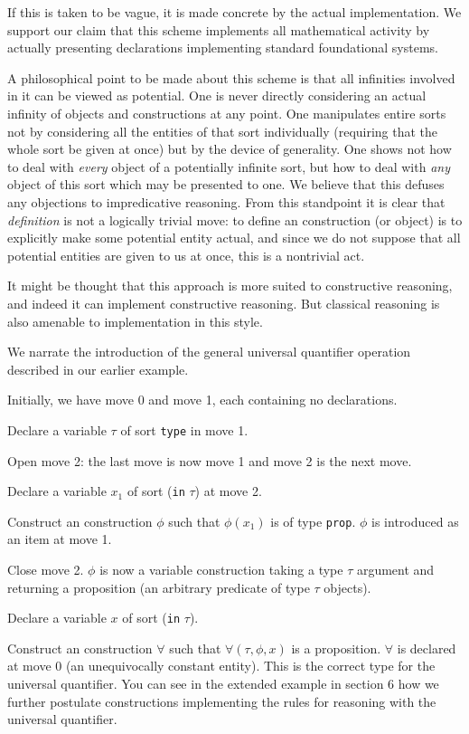 \documentclass[12pt]{article}
\begin{document}
If this is taken to be vague, it is made concrete by the actual implementation.  We support our claim that this scheme implements all mathematical activity by actually presenting declarations implementing standard foundational systems.

A philosophical point to be made about this scheme is that all infinities involved in it can be viewed as potential.   One is never directly considering an actual infinity of objects and constructions at any point.   One manipulates entire sorts not by considering all the entities of that sort individually (requiring that the whole sort be given at once) but by the device of generality.  One shows not how to deal with {\em every \/} object of a potentially infinite sort, but how to deal with {\em any\/} object of this sort which may be  presented to one.  We believe that this defuses any objections to impredicative reasoning.  From this standpoint it is clear that {\em definition} is not a logically trivial move:  to define an construction (or object) is to explicitly  make some potential entity actual, and since we do not suppose that all potential entities are given to us at once, this is a nontrivial act.

It might be thought that this approach is more suited to constructive reasoning, and indeed it can implement constructive reasoning.  But classical reasoning is also amenable to implementation in this style.

We narrate the introduction of the general universal quantifier operation described in our earlier example.

Initially, we have move 0 and move 1, each containing no declarations.

Declare a variable $\tau$ of sort {\tt type}  in move 1.

Open move 2:  the last move is now move 1 and move 2 is the next move.

Declare a variable $x_1$ of sort ({\tt in} $\tau$) at move 2.

Construct an construction $\phi$ such that $\phi(x_1)$ is of type {\tt prop}.  $\phi$ is introduced as an item
at move 1.

Close move 2.  $\phi$ is now a variable construction taking a type $\tau$ argument and returning a proposition (an arbitrary predicate of
type $\tau$ objects).

Declare a variable $x$ of sort ({\tt in} $\tau$).

Construct an construction $\forall$ such that $\forall(\tau,\phi,x)$ is a proposition.  $\forall$ is declared at move 0 (an unequivocally constant entity).  This is the correct type for
the universal quantifier.  You can see in the extended example in section 6 how we further postulate constructions implementing
the rules for reasoning with the universal quantifier.
\end{document}

